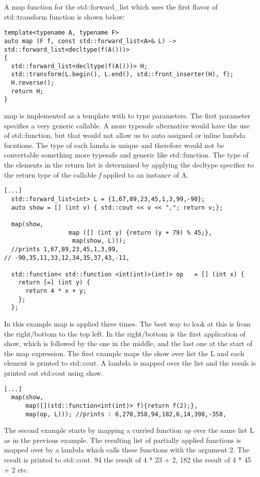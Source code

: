 \documentclass[12pt,fleqn]{article}
\begin{document}
A map function for the std::forward\_list which uses the first flavor of std::transform function is shown below:

\begin{lstlisting}
template<typename A, typename F>
auto map (F f, const std::forward_list<A>& L) -> std::forward_list<decltype(f(A()))>
{
  std::forward_list<decltype(f(A()))> H;
  std::transform(L.begin(), L.end(), std::front_inserter(H), f);
  H.reverse();
  return H;
}
\end{lstlisting}

map is implemented as a template with to type parameters. 
The first parameter specifies a very generic callable. 
A more typesafe alternative would have the use of std::function, but that would not allow us to auto assigned or inline lambda fucntions.
The type of each lamda is unique and therefore would not be convertable something more typesafe and generic like std::function.
The type of the elements in the return list is determined by applying the decltype specifier to the return type of the callable {\em f} applied to an instance of A.

\begin{lstlisting}
[...]
  std::forward_list<int> L = {1,67,89,23,45,1,3,99,-90};
  auto show = [] (int v) { std::cout << v << ","; return v;};
  
  map(show, 
                  map ([] (int y) {return (y + 79) % 45;},
                   map(show, L))); 
  //prints 1,67,89,23,45,1,3,99,
// -90,35,11,33,12,34,35,37,43,-11,

  std::function< std::function <int(int)>(int)> op   = [] (int x) {
    return [=] (int y) {
      return 4 * x + y;
    };
  };
\end{lstlisting}
In this example map is applied three times.
The best way to look at this is from the right/bottom to the top left. 
In the right/bottom is the first application of show, which is followed by the one in the middle, and the last one at the start of the map expression.
The first example maps the show over list the L and each element is printed to std::cout.
A lambda is mapped over the list and the resuls is printed out std:cout using show. 
\begin{lstlisting}
[...]
  map(show, 
      map([](std::function<int(int)> f){return f(2);}, 
	  map(op, L))); //prints : 6,270,358,94,182,6,14,398,-358,
\end{lstlisting}

The second example starts by mapping a curried function {\em op} over the same list L as in the previous example.
The resulting list of partially applied functions is mapped over by a lambda which calls these functions with the argument 2.
The result is printed to std::cout. 94 the result of 4 * 23 + 2, 182 the result of 4 * 45 + 2 etc.
\end{document}
